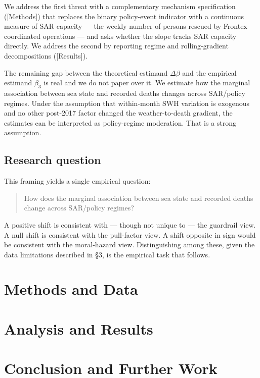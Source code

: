 \documentclass[
  11pt,
  a4paper,
]{article}
\begin{document}
We address the first threat with a complementary mechanism specification
({[}Methods{]}) that replaces the binary policy-event indicator with a
continuous measure of SAR capacity --- the weekly number of persons
rescued by Frontex-coordinated operations --- and asks whether the slope
tracks SAR capacity directly. We address the second by reporting regime
and rolling-gradient decompositions ({[}Results{]}).

The remaining gap between the theoretical estimand \(\Delta\beta\) and
the empirical estimand \(\beta_3\) is real and we do not paper over it.
We estimate how the marginal association between sea state and recorded
deaths changes across SAR/policy regimes. Under the assumption that
within-month SWH variation is exogenous and no other post-2017 factor
changed the weather-to-death gradient, the estimates can be interpreted
as policy-regime moderation. That is a strong assumption.

\subsection{Research question}\label{research-question}

This framing yields a single empirical question:

\begin{quote}
How does the marginal association between sea state and recorded deaths
change across SAR/policy regimes?
\end{quote}

A positive shift is consistent with --- though not unique to --- the
guardrail view. A null shift is consistent with the pull-factor view. A
shift opposite in sign would be consistent with the moral-hazard view.
Distinguishing among these, given the data limitations described in §3,
is the empirical task that follows.

\section{Methods and Data}\label{methods-and-data}

\section{Analysis and Results}\label{analysis-and-results}

\section{Conclusion and Further Work}\label{conclusion-and-further-work}
\end{document}
